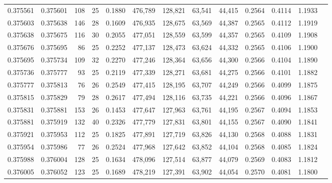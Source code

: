 \begin{tabular}{rrrrrrrrrrrrr}
0.375561 & 0.375601 &   108 &  25 &                                     0.1880 & 476,789 & 128,821 &  63,541 &  44,415 & 0.2564 & 0.4114 & 1.1933 \\
0.375603 & 0.375638 &   146 &  28 &                                     0.1609 & 476,935 & 128,675 &  63,569 &  44,387 & 0.2565 & 0.4112 & 1.1919 \\
0.375638 & 0.375675 &   116 &  30 &                                     0.2055 & 477,051 & 128,559 &  63,599 &  44,357 & 0.2565 & 0.4109 & 1.1908 \\
0.375676 & 0.375695 &    86 &  25 &                                     0.2252 & 477,137 & 128,473 &  63,624 &  44,332 & 0.2565 & 0.4106 & 1.1900 \\
0.375695 & 0.375734 &   109 &  32 &                                     0.2270 & 477,246 & 128,364 &  63,656 &  44,300 & 0.2566 & 0.4104 & 1.1890 \\
0.375736 & 0.375777 &    93 &  25 &                                     0.2119 & 477,339 & 128,271 &  63,681 &  44,275 & 0.2566 & 0.4101 & 1.1882 \\
0.375777 & 0.375813 &    76 &  26 &                                     0.2549 & 477,415 & 128,195 &  63,707 &  44,249 & 0.2566 & 0.4099 & 1.1875 \\
0.375815 & 0.375829 &    79 &  28 &                                     0.2617 & 477,494 & 128,116 &  63,735 &  44,221 & 0.2566 & 0.4096 & 1.1867 \\
0.375831 & 0.375881 &   153 &  26 &                                     0.1453 & 477,647 & 127,963 &  63,761 &  44,195 & 0.2567 & 0.4094 & 1.1853 \\
0.375881 & 0.375919 &   132 &  40 &                                     0.2326 & 477,779 & 127,831 &  63,801 &  44,155 & 0.2567 & 0.4090 & 1.1841 \\
0.375921 & 0.375953 &   112 &  25 &                                     0.1825 & 477,891 & 127,719 &  63,826 &  44,130 & 0.2568 & 0.4088 & 1.1831 \\
0.375954 & 0.375986 &    77 &  26 &                                     0.2524 & 477,968 & 127,642 &  63,852 &  44,104 & 0.2568 & 0.4085 & 1.1824 \\
0.375988 & 0.376004 &   128 &  25 &                                     0.1634 & 478,096 & 127,514 &  63,877 &  44,079 & 0.2569 & 0.4083 & 1.1812 \\
0.376005 & 0.376052 &   123 &  25 &                                     0.1689 & 478,219 & 127,391 &  63,902 &  44,054 & 0.2570 & 0.4081 & 1.1800 \\

\end{tabular}
